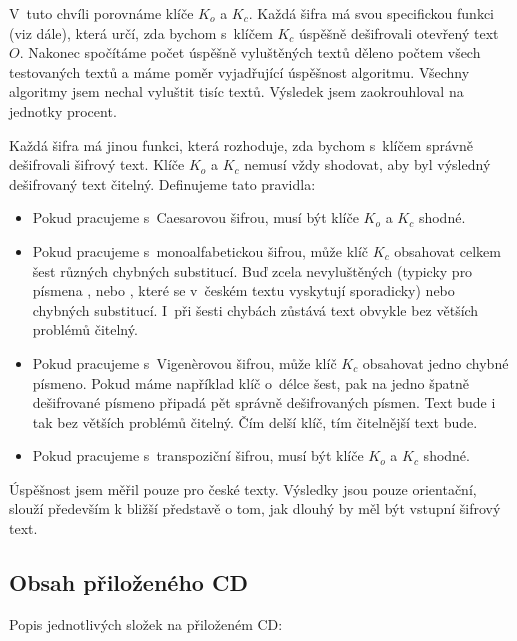 \documentclass[12pt]{article}
\theoremstyle{definition}
\begin{document}
V~tuto chvíli porovnáme klíče $K_o$ a $K_c$. Každá šifra má svou specifickou funkci (viz dále), která určí, zda bychom s~klíčem $K_c$ úspěšně dešifrovali otevřený text $O$. Nakonec spočítáme počet úspěšně vyluštěných textů děleno počtem všech testovaných textů a máme poměr vyjadřující úspěšnost algoritmu. Všechny algoritmy jsem nechal vyluštit tisíc textů. Výsledek jsem zaokrouhloval na jednotky procent.

Každá šifra má jinou funkci, která rozhoduje, zda bychom s~klíčem správně dešifrovali šifrový text. Klíče $K_o$ a $K_c$ nemusí vždy shodovat, aby byl výsledný dešifrovaný text čitelný. Definujeme tato pravidla:

 \begin{itemize}
\item Pokud pracujeme s~Caesarovou šifrou, musí být klíče $K_o$ a $K_c$ shodné. 
\item Pokud pracujeme s~monoalfabetickou šifrou, může klíč $K_c$ obsahovat celkem šest různých chybných substitucí. Buď zcela nevyluštěných (typicky pro písmena ,  nebo , které se v~českém textu vyskytují sporadicky) nebo chybných substitucí. I~při šesti chybách zůstává text obvykle bez větších problémů čitelný. 
\item Pokud pracujeme s~Vigenèrovou šifrou, může klíč $K_c$ obsahovat jedno chybné písmeno. Pokud máme například klíč o~délce šest, pak na jedno špatně dešifrované písmeno připadá pět správně dešifrovaných písmen. Text bude i tak bez větších problémů čitelný. Čím delší klíč, tím čitelnější text bude.
\item Pokud pracujeme s~transpoziční šifrou, musí být klíče $K_o$ a $K_c$ shodné. 
\end{itemize}

Úspěšnost jsem měřil pouze pro české texty. Výsledky jsou pouze orientační, slouží především k bližší představě o tom, jak dlouhý by měl být vstupní šifrový text.

\subsection{Obsah přiloženého CD}

Popis jednotlivých složek na přiloženém CD: 
\end{document}
